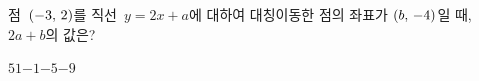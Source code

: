 점~$(-3,\mkern3mu 2)$를 직선~$y=2x+a$에 대하여 대칭이동한 점의 좌표가 $(b,\mkern3mu -4)$일 때, $2a+b$의 값은? 
\begin{choices32}{$5$}{$1$}{$-1$}{$-5$}{$-9$}\end{choices32}
